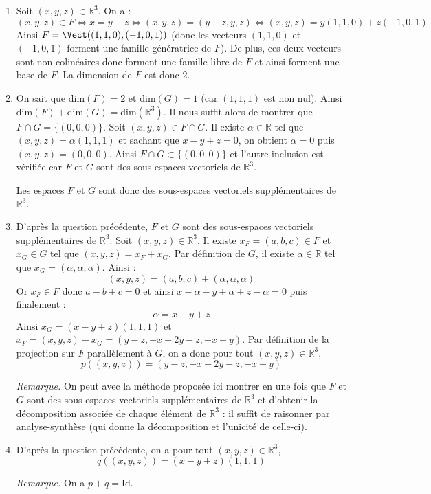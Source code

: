 \documentclass[a4paper,twoside,french,11pt]{VcCours}
\begin{document}
\begin{enumerate}
\item Soit $(x,y,z) \in \mathbb{R}^3$. On a :
$$ (x,y,z) \in F \Longleftrightarrow x=y-z \Longleftrightarrow (x,y,z) = (y-z,y,z) \Longleftrightarrow (x,y,z) = y(1,1,0) + z(-1,0,1)$$
Ainsi $F = \Vect((1,1,0), (-1,0,1))$ (donc les vecteurs $(1,1,0)$ et $(-1,0,1)$ forment une famille génératrice de $F$). De plus, ces deux vecteurs sont non colinéaires donc forment une famille libre de $F$ et ainsi forment une base de $F$. La dimension de $F$ est donc $2$.
\item On sait que $\textrm{dim}(F)=2$ et $\textrm{dim}(G)=1$ (car $(1,1,1)$ est non nul). Ainsi $\textrm{dim}(F) + \textrm{dim}(G) = \textrm{dim}(\mathbb{R}^3)$. Il nous suffit alors de montrer que $F \cap G = \lbrace (0,0,0) \rbrace$. Soit $(x,y,z) \in F \cap G$. Il existe $\alpha \in \mathbb{R}$ tel que $(x,y,z) = \alpha (1,1,1)$ et sachant que $x-y+z=0$, on obtient $\alpha = 0$ puis $(x,y,z)=(0,0,0)$. Ainsi $F \cap G \subset \lbrace (0,0,0) \rbrace$ et l'autre inclusion est vérifiée car $F$ et $G$ sont des sous-espaces vectoriels de $\mathbb{R}^3$.



\noindent Les espaces $F$ et $G$ sont donc des sous-espaces vectoriels supplémentaires de $\mathbb{R}^3$.
\item D'après la question précédente, $F$ et $G$ sont  des sous-espaces vectoriels supplémentaires de $\mathbb{R}^3$. Soit $(x,y,z) \in \mathbb{R}^3$. Il existe $x_F = (a,b,c) \in F$ et $x_G \in G$ tel que $(x,y,z) = x_F + x_G$. Par définition de $G$, il existe $\alpha \in \mathbb{R}$ tel que $x_G = (\alpha, \alpha, \alpha)$. Ainsi :
$$ (x,y,z) = (a,b,c) + (\alpha, \alpha, \alpha)$$
Or $x_F \in F$ donc $a-b+c=0$ et ainsi $x- \alpha- y + \alpha + z - \alpha = 0$ puis finalement :
$$ \alpha = x-y+z $$
Ainsi $x_G = (x-y+z) (1,1,1)$ et $x_F = (x,y,z) - x_G = (y-z, -x+2y-z,-x+y)$. Par définition de la projection sur $F$ parallèlement à $G$, on a donc pour tout $(x,y,z) \in \mathbb{R}^3$,
$$ p((x,y,z)) = (y-z, -x+2y-z,-x+y)$$



\noindent \textit{Remarque.} On peut avec la méthode proposée ici montrer en une fois que $F$ et $G$ sont des sous-espaces vectoriels supplémentaires de $\mathbb{R}^3$ et d'obtenir la décomposition associée de chaque élément de $\mathbb{R}^3$ : il suffit de raisonner par analyse-synthèse (qui donne la décomposition et l'unicité de celle-ci).
\item D'après la question précédente, on a pour tout $(x,y,z) \in \mathbb{R}^3$, 
$$ q((x,y,z)) = (x-y+z) (1,1,1)$$



\noindent \textit{Remarque.} On a $p+q=\textrm{Id}$.
\end{enumerate}
\end{document}
